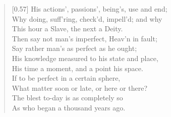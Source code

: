 \begin{verse}[0.57\textwidth]
His actions', passions', being's, use and end;\\
Why doing, suff'ring, check'd, impell'd; and why\\
This hour a Slave, the next a Deity.\\
\vin Then say not man's imperfect, Heav'n in fault;\\
Say rather man's as perfect as he ought;\\
His knowledge measured to his state and place,\\
His time a moment, and a point his space.\\
If to be perfect in a certain sphere,\\
What matter soon or late, or here or there?\\
The blest to-day is as completely so\\
As who began a thousand years ago.


\end{verse}
